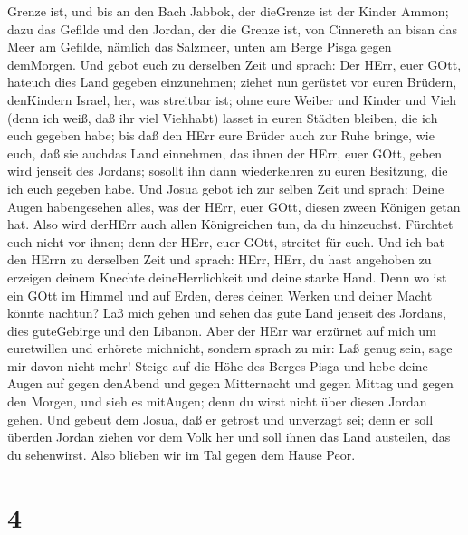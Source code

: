 Grenze ist, und bis an den Bach Jabbok, der dieGrenze ist der Kinder
Ammon;  dazu das Gefilde und den Jordan, der die Grenze
ist, von Cinnereth an bisan das Meer am Gefilde, nämlich das Salzmeer,
unten am Berge Pisga gegen demMorgen.  Und gebot euch zu
derselben Zeit und sprach: Der HErr, euer GOtt, hateuch dies Land
gegeben einzunehmen; ziehet nun gerüstet vor euren Brüdern, denKindern
Israel, her, was streitbar ist;  ohne eure Weiber und
Kinder und Vieh (denn ich weiß, daß ihr viel Viehhabt) lasset in euren
Städten bleiben, die ich euch gegeben habe;  bis daß den
HErr eure Brüder auch zur Ruhe bringe, wie euch, daß sie auchdas Land
einnehmen, das ihnen der HErr, euer GOtt, geben wird jenseit des
Jordans; sosollt ihn dann wiederkehren zu euren Besitzung, die ich euch
gegeben habe.  Und Josua gebot ich zur selben Zeit und
sprach: Deine Augen habengesehen alles, was der HErr, euer GOtt, diesen
zween Königen getan hat. Also wird derHErr auch allen Königreichen tun,
da du hinzeuchst.  Fürchtet euch nicht vor ihnen; denn der
HErr, euer GOtt, streitet für euch.  Und ich bat den HErrn
zu derselben Zeit und sprach:  HErr, HErr, du hast
angehoben zu erzeigen deinem Knechte deineHerrlichkeit und deine starke
Hand. Denn wo ist ein GOtt im Himmel und auf Erden, deres deinen Werken
und deiner Macht könnte nachtun?  Laß mich gehen und sehen
das gute Land jenseit des Jordans, dies guteGebirge und den Libanon.
 Aber der HErr war erzürnet auf mich um euretwillen und
erhörete michnicht, sondern sprach zu mir: Laß genug sein, sage mir
davon nicht mehr!  Steige auf die Höhe des Berges Pisga und
hebe deine Augen auf gegen denAbend und gegen Mitternacht und gegen
Mittag und gegen den Morgen, und sieh es mitAugen; denn du wirst nicht
über diesen Jordan gehen.  Und gebeut dem Josua, daß er
getrost und unverzagt sei; denn er soll überden Jordan ziehen vor dem
Volk her und soll ihnen das Land austeilen, das du sehenwirst.
 Also blieben wir im Tal gegen dem Hause Peor.

\hypertarget{section-3}{%
\section{4}\label{section-3}}

